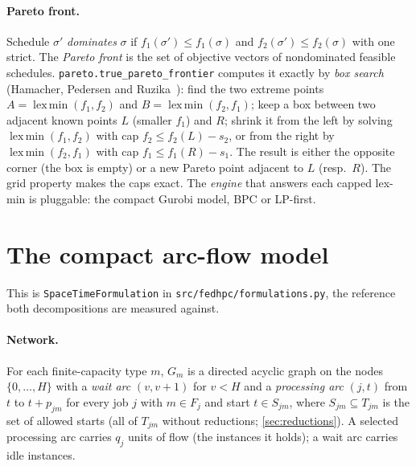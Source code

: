 \documentclass[11pt,a4paper]{article}
\theoremstyle{definition}
\theoremstyle{remark}
\newcommand{\code}[1]{\texttt{#1}}
\begin{document}
\paragraph{Pareto front.} Schedule $\sigma'$ \emph{dominates} $\sigma$ if
$f_1(\sigma')\le f_1(\sigma)$ and $f_2(\sigma')\le f_2(\sigma)$ with one strict.
The \emph{Pareto front} is the set of objective vectors of nondominated feasible
schedules. \code{pareto.true\_pareto\_frontier} computes it exactly by
\emph{box search} (Hamacher, Pedersen and Ruzika~\cite{hamacher2007}): find the
two extreme points $A=\operatorname{lex\,min}(f_1,f_2)$ and
$B=\operatorname{lex\,min}(f_2,f_1)$; keep a box between two adjacent known
points $L$ (smaller $f_1$) and $R$; shrink it from the left by solving
$\operatorname{lex\,min}(f_1,f_2)$ with cap $f_2\le f_2(L)-s_2$, or from the
right by $\operatorname{lex\,min}(f_2,f_1)$ with cap $f_1\le f_1(R)-s_1$. The
result is either the opposite corner (the box is empty) or a new Pareto point
adjacent to $L$ (resp.\ $R$). The grid property makes the caps exact. The
\emph{engine} that answers each capped lex-min is pluggable: the compact
Gurobi model, BPC or LP-first.

\section{The compact arc-flow model}\label{sec:compact}

This is \code{SpaceTimeFormulation} in \code{src/fedhpc/formulations.py}, the
reference both decompositions are measured against.

\paragraph{Network.} For each finite-capacity type $m$, $G_m$ is a directed
acyclic graph on the nodes $\{0,\dots,H\}$ with a \emph{wait arc} $(v,v+1)$ for
$v<H$ and a \emph{processing arc} $(j,t)$ from $t$ to $t+p_{jm}$ for every job
$j$ with $m\in F_j$ and start $t\in S_{jm}$, where $S_{jm}\subseteq T_{jm}$ is
the set of allowed starts (all of $T_{jm}$ without reductions;
\cref{sec:reductions}). A selected processing arc carries $q_j$ units of flow
(the instances it holds); a wait arc carries idle instances.
\end{document}

